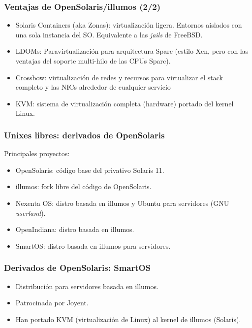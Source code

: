 \documentclass{beamer}
\begin{document}

\begin{frame}
\frametitle{Ventajas de OpenSolaris/illumos (2/2)}

\begin{itemize}
\item \alert{Solaris Containers} (aka \alert{Zonas}): virtualización ligera. Entornos aislados con una sola instancia del SO. Equivalente a las \textit{jails} de FreeBSD.
\item \alert{LDOMs}: Paravirtualización para arquitectura Sparc (estilo Xen, pero con las ventajas del soporte multi-hilo de las CPUs Sparc).
\item Crossbow: virtualización de redes y recursos para virtualizar el stack completo y las NICs alrededor de cualquier servicio 
\item \alert{KVM:} sistema de virtualización completa (hardware) portado del kernel Linux.
\end{itemize}

\end{frame}


\begin{frame}
\frametitle{Unixes libres: derivados de OpenSolaris}

Principales proyectos:

\begin{itemize}
\item \alert{OpenSolaris}: código base del privativo Solaris 11.
\item \alert{illumos}: fork libre del código de OpenSolaris.
\item \alert{Nexenta OS}: distro basada en illumos y Ubuntu para servidores (GNU \textit{userland}).
\item \alert{OpenIndiana}: distro basada en illumos.
\item \alert{SmartOS}: distro basada en illumos para servidores.
\end{itemize}

\end{frame}


\begin{frame}
\frametitle{Derivados de OpenSolaris: SmartOS}

\begin{itemize}
\item Distribución para servidores basada en illumos.
\item Patrocinada por Joyent.
\item Han portado KVM (virtualización de Linux) al kernel de illumos (Solaris).  
\end{itemize}

\end{frame}
\end{document}
